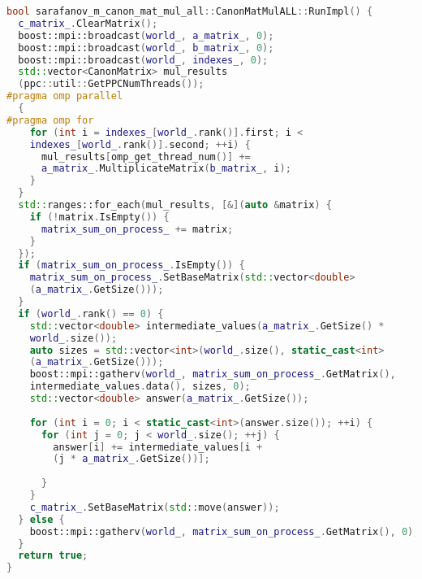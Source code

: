 \documentclass[20pt]{article}
\begin{document}
\begin{lstlisting}[language=C++]
bool sarafanov_m_canon_mat_mul_all::CanonMatMulALL::RunImpl() {
  c_matrix_.ClearMatrix();
  boost::mpi::broadcast(world_, a_matrix_, 0);
  boost::mpi::broadcast(world_, b_matrix_, 0);
  boost::mpi::broadcast(world_, indexes_, 0);
  std::vector<CanonMatrix> mul_results
  (ppc::util::GetPPCNumThreads());
#pragma omp parallel
  {
#pragma omp for
    for (int i = indexes_[world_.rank()].first; i < 
    indexes_[world_.rank()].second; ++i) {
      mul_results[omp_get_thread_num()] += 
      a_matrix_.MultiplicateMatrix(b_matrix_, i);
    }
  }
  std::ranges::for_each(mul_results, [&](auto &matrix) {
    if (!matrix.IsEmpty()) {
      matrix_sum_on_process_ += matrix;
    }
  });
  if (matrix_sum_on_process_.IsEmpty()) {
    matrix_sum_on_process_.SetBaseMatrix(std::vector<double>
    (a_matrix_.GetSize()));
  }
  if (world_.rank() == 0) {
    std::vector<double> intermediate_values(a_matrix_.GetSize() * 
    world_.size());
    auto sizes = std::vector<int>(world_.size(), static_cast<int>
    (a_matrix_.GetSize()));
    boost::mpi::gatherv(world_, matrix_sum_on_process_.GetMatrix(), 
    intermediate_values.data(), sizes, 0);
    std::vector<double> answer(a_matrix_.GetSize());
    
    for (int i = 0; i < static_cast<int>(answer.size()); ++i) {
      for (int j = 0; j < world_.size(); ++j) {
        answer[i] += intermediate_values[i +
        (j * a_matrix_.GetSize())];
        
      }
    }
    c_matrix_.SetBaseMatrix(std::move(answer));
  } else {
    boost::mpi::gatherv(world_, matrix_sum_on_process_.GetMatrix(), 0);
  }
  return true;
}
\end{lstlisting}
\end{document}
